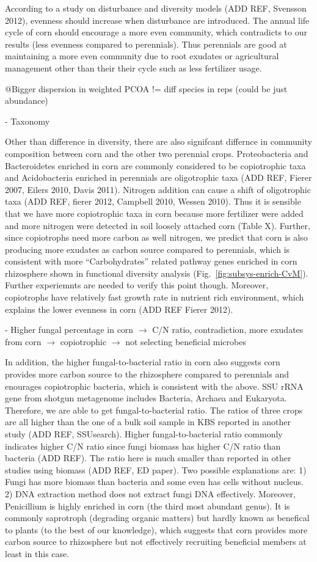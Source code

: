 \documentclass[12pt]{article}
\begin{document}
According to a study on disturbance and diversity models (ADD REF, Svensson 2012), evenness should increase when disturbance are introduced. The annual life cycle of corn should encourage a more even community, which contradicts to our results (less evenness compared to perennials). Thus perennials are good at maintaining a more even community due to root exudates or agricultural management other than their their cycle such as less fertilizer usage.

@Bigger dispersion in weighted PCOA != diff species in reps (could be just abundance)

- Taxonomy

Other than difference in diversity, there are also signifcant differnce in community composition between corn and the other two perennial crops. Proteobacteria and Bacteroidetes enriched in corn are commonly considered to be copiotrophic taxa and Acidobacteria enriched in perennials are oligotrophic taxa (ADD REF, Fierer 2007, Eilers 2010, Davis 2011). Nitrogen addition can cause a shift of oligotrophic taxa (ADD REF, fierer 2012, Campbell 2010, Wessen 2010). Thus it is sensible that we have more copiotrophic taxa in corn because more fertilizer were added and more nitrogen were detected in soil loosely attached corn (Table X). Further, since copiotrophs need more carbon as well nitrogen, we predict that corn is also producing more exudates as carbon source compared to perennials, which is consistent with more ``Carbohydrates'' related pathway genes enriched in corn rhizosphere shown in functional diversity analysis (Fig.~\ref{fig:subsys-enrich-CvM}). Further experiemnts are needed to verify this point though. Moreover, copiotrophs have relatively fast growth rate in nutrient rich environment, which explains the lower evenness in corn (ADD REF Fierer 2012).

- Higher fungal percentage in corn $\rightarrow$ C/N ratio, contradiction, more exudates from corn $\rightarrow$ copiotrophic $\rightarrow$ not selecting beneficial microbes

In addition, the higher fungal-to-bacterial ratio in corn also suggests corn provides more carbon source to the rhizosphere compared to perennials and enourages copiotrophic bacteria, which is consistent with the above. SSU rRNA gene from shotgun metagenome includes Bacteria, Archaea and Eukaryota. Therefore, we are able to get fungal-to-bacterial ratio. The ratios of three crops are all higher than the one of a bulk soil sample in KBS reported in another study (ADD REF, SSUsearch). Higher fungal-to-bacterial ratio commonly indicates higher C/N ratio since fungi biomass has higher C/N ratio than bacteria (ADD REF). The ratio here is much smaller than reported in other studies using biomass (ADD REF, ED paper). Two possible explanations are: 1) Fungi has more biomass than bacteria and some even has cells without nucleus. 2) DNA extraction method does not extract fungi DNA effectively. Moreover, Penicillium is highly enriched in corn (the third most abundant genus). It is commonly saprotroph (degrading organic matters) but hardly known as benefical to plants (to the best of our knowledge), which suggests that corn provides more carbon source to rhizosphere but not effectively recruiting beneficial members at least in this case.
\end{document}
